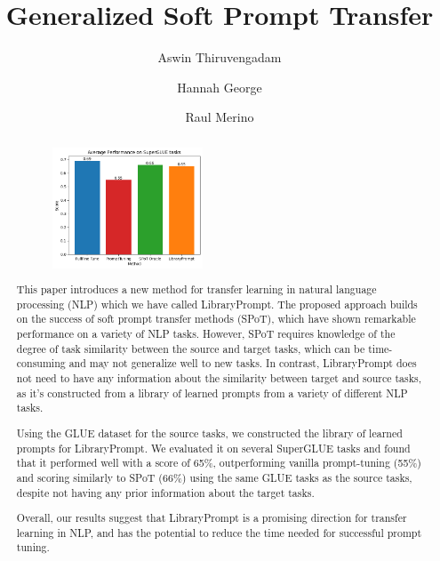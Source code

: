 \documentclass[final,6p,times,twocolumn,authoryear]{elsarticle}
\begin{document}
\begin{frontmatter}

\title{Generalized Soft Prompt Transfer}

\author[berkeley]{Aswin Thiruvengadam}
\author[berkeley]{Hannah George}
\author[berkeley]{Raul Merino}

\begin{abstract}
\begin{figure}
    \centering
    \includegraphics[width=0.45\textwidth]{bar_chart_results.png}
\end{figure}
This paper introduces a new method for transfer learning in natural language processing (NLP) which we have called LibraryPrompt. The proposed approach builds on the success of soft prompt transfer methods (SPoT), which have shown remarkable performance on a variety of NLP tasks. However, SPoT requires knowledge of the degree of task similarity between the source and target tasks, which can be time-consuming and may not generalize well to new tasks. In contrast, LibraryPrompt does not need to have any information about the similarity between target and source tasks, as it’s constructed from a library of learned prompts from a variety of different NLP tasks.

Using the GLUE dataset for the source tasks, we constructed the library of learned prompts for LibraryPrompt. We evaluated it on several SuperGLUE tasks and found that it performed well with a score of 65\%, outperforming vanilla prompt-tuning (55\%) and scoring similarly to SPoT (66\%) using the same GLUE tasks as the source tasks, despite not having any prior information about the target tasks.

Overall, our results suggest that LibraryPrompt is a promising direction for transfer learning in NLP, and has the potential to reduce the time needed for successful prompt tuning.
\end{abstract}



\end{frontmatter}
\end{document}
